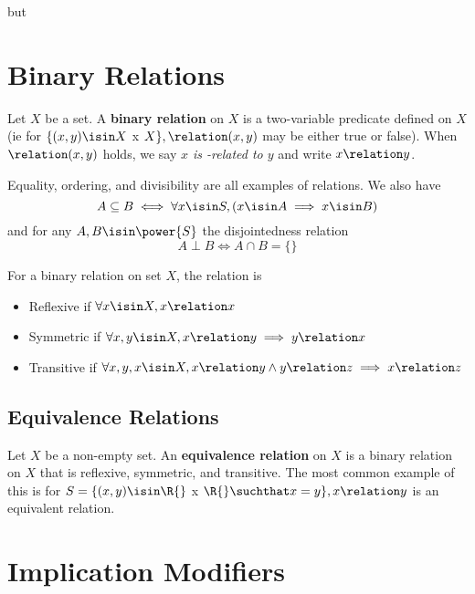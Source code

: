 \documentclass[12pt]{article}
\begin{document}
but




\section*{Binary Relations}
Let $X$ be a set. A {\bf binary relation} on $X$ is a two-variable predicate \relation defined on $X$ (ie for $\{ (x,y) \isin X$ x $X \}, \relation (x,y)$ may be either true or false). When $\relation (x,y)$ holds, we say \emph{$x$ is \relation -related to $y$} and write $x \relation y$.

Equality, ordering, and divisibility are all examples of relations. We also have \[ A \subseteq B \iff \forall x \isin S, (x \isin A \implies x \isin B) \] and for any $A, B \isin \power{S}$ the disjointedness relation \[ A \perp B \iff A \cap B = \{ \} \]

For a binary relation on set $X$, the relation is
\begin{itemize}
\item Reflexive if $\forall x \isin X, x \relation x$
\item Symmetric if $\forall x, y \isin X, x \relation y \implies y \relation x$
\item Transitive if $\forall x, y, x \isin X, x \relation y \land y \relation z \implies x \relation z$
\end{itemize}

\subsection*{Equivalence Relations}
Let $X$ be a non-empty set. An {\bf equivalence relation} on $X$ is a binary relation on $X$ that is reflexive, symmetric, and transitive. The most common example of this is for $S = \{ (x,y) \isin \R{}$ x $\R{} \suchthat x = y \}, x \relation y$ is an equivalent relation.

\section*{Implication Modifiers}
\end{document}

